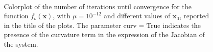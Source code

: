 \documentclass[a4paper,11pt]{article}
\begin{document}
\begin{figure}[H]
	 \
	 \\
	\caption{Colorplot of the number of iterations until convergence for the function $f_{b}(\textbf{x})$, with $\mu=10^{-12}$ and different values of $\textbf{x}_{0}$, reported in the title of the plots. The parameter curv = True indicates the presence of the curvature term in the expression of the Jacobian of the system.}
	\label{Fig:func_b_colorplot}
\end{figure}
\end{document}
